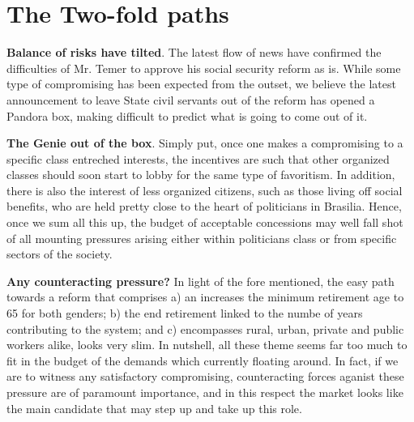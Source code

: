 \documentclass{report}
\begin{document}
\section{The Two-fold paths}
\label{sec:org5e807ff}
\begin{compactitem}[$\diamond$]
\item \textbf{Balance of risks have tilted}. The latest flow of news have
confirmed the difficulties of Mr. Temer to approve his social
security reform as is. While some type of compromising has been
expected from the outset, we believe the latest announcement to
leave State civil servants out of the reform has opened a Pandora
box, making difficult to predict what is going to come out of it.

\item \textbf{The Genie out of the box}. Simply put, once one makes a
compromising to a specific class entreched interests, the incentives
are such that other organized classes should soon start to lobby for
the same type of favoritism. In addition, there is also the interest
of less organized citizens, such as those living off social
benefits, who are held pretty close to the heart of politicians in
Brasilia. Hence, once we sum all this up, the budget of acceptable
concessions may well fall shot of all mounting pressures arising
either within politicians class or from specific sectors of the
society.

\item \textbf{Any counteracting pressure?} In light of the fore mentioned, the
easy path towards a reform that comprises a) an increases the
minimum retirement age to 65 for both genders; b) the end retirement
linked to the numbe of years contributing to the system; and c)
encompasses rural, urban, private and public workers alike, looks
very slim. In nutshell, all these theme seems far too much to fit in
the budget of the demands which currently floating around. In fact,
if we are to witness any satisfactory compromising, counteracting
forces aganist these pressure  are of paramount importance, and in this respect the market
looks like the main candidate that may step up and take up this
role.
\end{compactitem}
\end{document}
